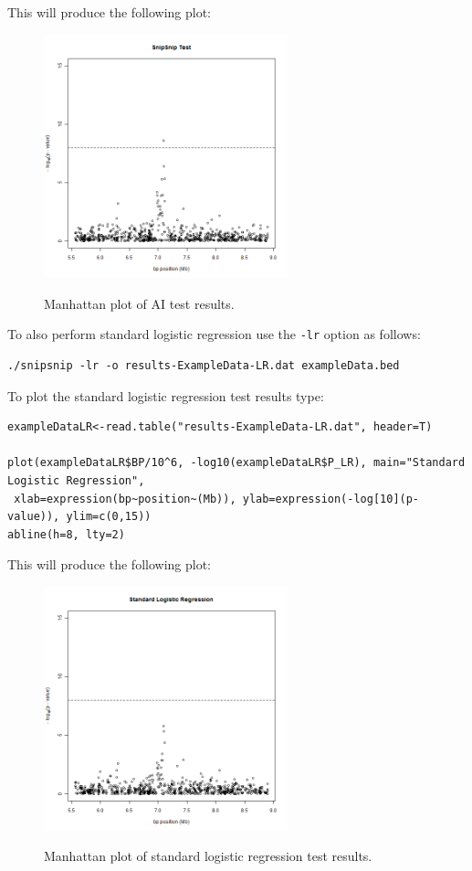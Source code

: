 \documentclass[a4paper,12pt]{article}
\newcommand{\code}[1]{{\footnotesize{{\tt #1}}}}
\begin{document}
This will produce the following plot: 
{\begin{figure}[ht]
{\begin{center}
{\includegraphics[width=200pt]{exampleSS.png}}
\caption{Manhattan plot of AI test results.}
\label{example-fig}
\end{center}}
\end{figure}
}

To also perform standard logistic regression use the \code{-lr} option as follows: 
\begin{verbatim}
./snipsnip -lr -o results-ExampleData-LR.dat exampleData.bed
\end{verbatim}

To plot the standard logistic regression test results type: 
\begin{verbatim}
exampleDataLR<-read.table("results-ExampleData-LR.dat", header=T)

plot(exampleDataLR$BP/10^6, -log10(exampleDataLR$P_LR), main="Standard Logistic Regression",
 xlab=expression(bp~position~(Mb)), ylab=expression(-log[10](p-value)), ylim=c(0,15)) 
abline(h=8, lty=2)

\end{verbatim}

This will produce the following plot: 
{\begin{figure}[ht]
{\begin{center}
{\includegraphics[width=200pt]{exampleSS_LR.png}}
\caption{Manhattan plot of standard logistic regression test results.}
\label{example-lr-fig}
\end{center}}
\end{figure}
}
\end{document}
